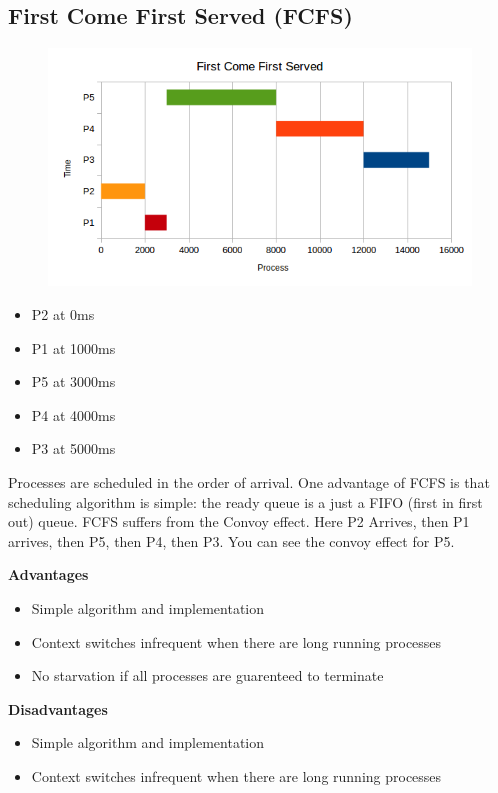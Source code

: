 \subsection{First Come First Served (FCFS)}

\begin{figure}[htbp]
\centering
\includegraphics[width=\textwidth]{scheduling/images/fcfs.png}
\caption{}
\end{figure}

\begin{itemize}
\tightlist
\item
  P2 at 0ms
\item
  P1 at 1000ms
\item
  P5 at 3000ms
\item
  P4 at 4000ms
\item
  P3 at 5000ms
\end{itemize}

Processes are scheduled in the order of arrival. One advantage of FCFS is that scheduling algorithm is simple: the ready queue is a just a FIFO (first in first out) queue. FCFS suffers from the Convoy effect. Here P2 Arrives, then P1 arrives, then P5, then P4, then P3. You can see the convoy effect for P5.

\textbf{Advantages} 

\begin{itemize}
\item Simple algorithm and implementation
\item Context switches infrequent when there are long running processes
\item No starvation if all processes are guarenteed to terminate
\end{itemize}

\textbf{Disadvantages} 
\begin{itemize}
\item Simple algorithm and implementation
\item Context switches infrequent when there are long running processes

\end{itemize}

